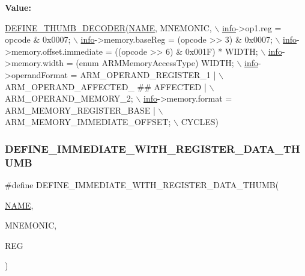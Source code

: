 {\bfseries Value\+:}
\begin{DoxyCode}
\mbox{\hyperlink{decoder-thumb_8c_a44d34ec3fd7c2c2ee51ff5966678c86e}{DEFINE\_THUMB\_DECODER}}(\mbox{\hyperlink{inflate_8h_a164ea0159d5f0b5f12a646f25f99eceaa67bc2ced260a8e43805d2480a785d312}{NAME}}, MNEMONIC, \(\backslash\)
        \mbox{\hyperlink{libretro_8h_structretro__game__info}{info}}->op1.reg = opcode & 0x0007; \(\backslash\)
        \mbox{\hyperlink{libretro_8h_structretro__game__info}{info}}->memory.baseReg = (opcode >> 3) & 0x0007; \(\backslash\)
        \mbox{\hyperlink{libretro_8h_structretro__game__info}{info}}->memory.offset.immediate = ((opcode >> 6) & 0x001F) * WIDTH; \(\backslash\)
        \mbox{\hyperlink{libretro_8h_structretro__game__info}{info}}->memory.width = (\textcolor{keyword}{enum} ARMMemoryAccessType) WIDTH; \(\backslash\)
        \mbox{\hyperlink{libretro_8h_structretro__game__info}{info}}->operandFormat = ARM\_OPERAND\_REGISTER\_1 | \(\backslash\)
            ARM\_OPERAND\_AFFECTED\_ ## AFFECTED | \(\backslash\)
            ARM\_OPERAND\_MEMORY\_2; \(\backslash\)
        \mbox{\hyperlink{libretro_8h_structretro__game__info}{info}}->memory.format = ARM\_MEMORY\_REGISTER\_BASE | \(\backslash\)
            ARM\_MEMORY\_IMMEDIATE\_OFFSET; \(\backslash\)
        CYCLES)
\end{DoxyCode}
\mbox{\label{decoder-thumb_8c_a34ad2c15aa07473aa0f2ace6296f0504}} 
\subsubsection{\texorpdfstring{D\+E\+F\+I\+N\+E\+\_\+\+I\+M\+M\+E\+D\+I\+A\+T\+E\+\_\+\+W\+I\+T\+H\+\_\+\+R\+E\+G\+I\+S\+T\+E\+R\+\_\+\+D\+A\+T\+A\+\_\+\+T\+H\+U\+MB}{DEFINE\_IMMEDIATE\_WITH\_REGISTER\_DATA\_THUMB}}
{\footnotesize\ttfamily \#define D\+E\+F\+I\+N\+E\+\_\+\+I\+M\+M\+E\+D\+I\+A\+T\+E\+\_\+\+W\+I\+T\+H\+\_\+\+R\+E\+G\+I\+S\+T\+E\+R\+\_\+\+D\+A\+T\+A\+\_\+\+T\+H\+U\+MB(\begin{DoxyParamCaption}\item[{}]{\mbox{\hyperlink{inflate_8h_a164ea0159d5f0b5f12a646f25f99eceaa67bc2ced260a8e43805d2480a785d312}{N\+A\+ME}},  }\item[{}]{M\+N\+E\+M\+O\+N\+IC,  }\item[{}]{R\+EG }\end{DoxyParamCaption})}

